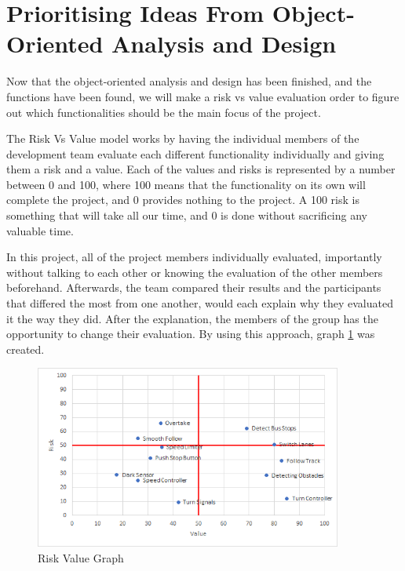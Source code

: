 \section{Prioritising Ideas From Object-Oriented Analysis and Design}

Now that the object-oriented analysis and design has been finished, and the functions have been found, we will make a risk vs value evaluation order to figure out which functionalities should be the main focus of the project.%

The Risk Vs Value model works by having the individual members of the development team evaluate each different functionality individually and giving them a risk and a value. Each of the values and risks is represented by a number between 0 and 100, where 100 means that the functionality on its own will complete the project, and 0 provides nothing to the project. A 100 risk is something that will take all our time, and 0 is done without sacrificing any valuable time. 

In this project, all of the project members individually evaluated, importantly without talking to each other or knowing the evaluation of the other members beforehand. Afterwards, the team compared their results and the participants that differed the most from one another, would each explain why they evaluated it the way they did. After the explanation, the members of the group has the opportunity to change their evaluation. By using this approach, graph \ref{fig:RiskValueGraph} was created.

\begin{figure}[!ht]
    \centering
	\includegraphics[width=0.9\textwidth]{Images/Graphs/RiskValue.png}
    \caption{Risk Value Graph}
    \label{fig:RiskValueGraph}
\end{figure}

